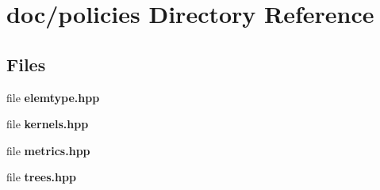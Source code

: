 \section{doc/policies Directory Reference}
\label{dir_2630b423a4c4e159d091c9f74d845bea}
\subsection*{Files}
\begin{DoxyCompactItemize}
\item 
file {\bf elemtype.\+hpp}
\item 
file {\bf kernels.\+hpp}
\item 
file {\bf metrics.\+hpp}
\item 
file {\bf trees.\+hpp}
\end{DoxyCompactItemize}
